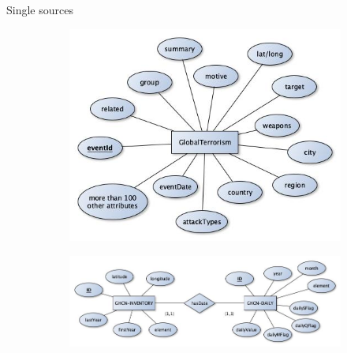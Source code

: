 \documentclass{beamer}
\begin{document}
\begin{frame}{Single sources}
\begin{figure}
\begin{subfigure}[b]{0.315\textwidth}
			\includegraphics[width=\textwidth]{ER/g2-terror.jpg}
		\end{subfigure}
	\end{figure}
	\begin{figure}
		\begin{subfigure}[b]{0.7\textwidth}
			\includegraphics[width=\textwidth]{ER/g2-weather.jpg}
		\end{subfigure}
	\end{figure}
\end{frame}
\end{document}
